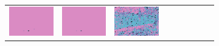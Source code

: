 \documentclass{ipol}
\begin{document}
\begin{figure}[ht]
\begin{subfigure}[t]{\linewidth}
\begin{tabular}{ccccccccc}
                \includegraphics[width=\s]{images/tower/AHD/iso_64_grids.png}&
                \includegraphics[width=\s]{images/tower/DCB/iso_64_grids.png}&
                \includegraphics[width=\s]{images/tower/DHT/iso_64_grids.png}&

\end{tabular}
\end{subfigure}
\end{figure}
\end{document}
